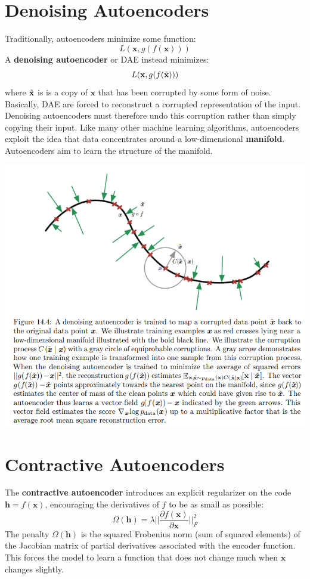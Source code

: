 \section{Denoising Autoencoders}
Traditionally, autoencoders minimize some function:
\[L(\textbf{x}, g(f(\textbf{x})))\]
A \textbf{denoising autoencoder} or DAE instead minimizes:
\[L(\textbf{x}, g(f(\Tilde{\textbf{x}})))\]
where $\Tilde{\textbf{x}}$ is is a copy of $\textbf{x}$ that has been corrupted by some form of noise. Basically, DAE are forced to reconstruct a corrupted representation of the input. Denoising autoencoders must therefore undo this corruption rather than simply copying their input.\newline\newline
Like many other machine learning algorithms, autoencoders exploit the idea
that data concentrates around a low-dimensional \textbf{manifold}. Autoencoders aim to learn the structure of the manifold.
\begin{center}
    \includegraphics[scale=0.6]{images/manifold.png}
\end{center}

\section{Contractive Autoencoders}
The \textbf{contractive autoencoder} introduces an explicit regularizer on the code $\textbf{h} = f(\textbf{x})$, encouraging the derivatives of $f$ to be as small as possible:
\[\Omega(\textbf{h}) = \lambda ||\frac{\partial f(\textbf{x})}{\partial \textbf{x}}||^2_F\]
The penalty $\Omega(\textbf{h})$ is the squared Frobenius norm (sum of squared elements) of the Jacobian matrix of partial derivatives associated with the encoder function.\newline\newline
This forces the model to learn a function that does not change much when $\textbf{x}$ changes slightly.

